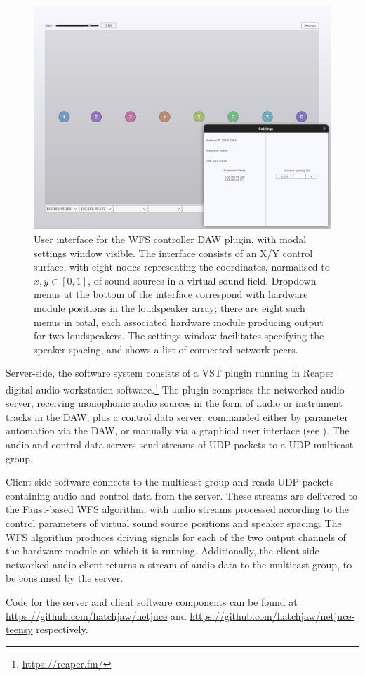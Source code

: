 \begin{figure}[ht]
    \centering
    \includegraphics[width=\textwidth]{figures/plugin}
    \caption{
        User interface for the WFS controller DAW plugin, with modal
        settings window visible.
        The interface consists of an X/Y control surface, with eight nodes
        representing the coordinates, normalised to $x,y \in [0,1]$, of sound
        sources in a virtual sound field.
        Dropdown menus at the bottom of the interface correspond with hardware
        module positions in the loudspeaker array; there are eight such menus
        in total, each associated hardware module producing output for two
        loudspeakers.
        The settings window facilitates specifying the speaker spacing, and
        shows a list of connected network peers.
    }
    \label{fig:plugin-interface}
\end{figure}

Server-side, the software system consists of a VST plugin running in Reaper
digital audio workstation software.\footnote{\url{https://reaper.fm/}}
The plugin comprises the networked audio server, receiving monophonic audio
sources in the form of audio or instrument tracks in the DAW, plus a control
data server, commanded either by parameter automation via the DAW, or manually
via a graphical user interface (see ).
The audio and control data servers send streams of UDP packets to a UDP
multicast group.

Client-side software connects to the multicast group and reads UDP packets
containing audio and control data from the server.
These streams are delivered to the Faust-based WFS algorithm, with audio
streams processed according to the control parameters of virtual sound source
positions and speaker spacing.
The WFS algorithm produces driving signals for each of the two output channels
of the hardware module on which it is running.
Additionally, the client-side networked audio client returns a stream of audio
data to the multicast group, to be consumed by the server.

Code for the server and client software components can be found at
\url{https://github.com/hatchjaw/netjuce} and
\url{https://github.com/hatchjaw/netjuce-teensy} respectively.
